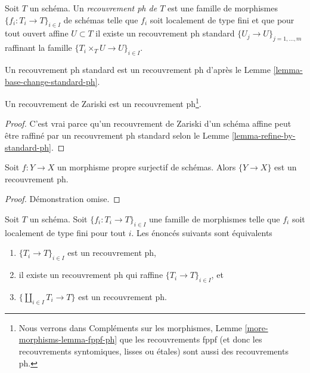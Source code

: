 \begin{definition}
\label{definition-ph-covering}
Soit $T$ un schéma. Un {\it recouvrement ph de $T$} est une famille de morphismes $\{f_i : T_i \to T\}_{i \in I}$ de schémas telle que $f_i$ soit localement de type fini et que pour tout ouvert affine $U \subset T$ il existe un recouvrement ph standard $\{U_j \to U\}_{j = 1, \ldots, m}$ raffinant la famille $\{T_i \times_T U \to U\}_{i \in I}$.
\end{definition}

\noindent
Un recouvrement ph standard est un recouvrement ph d'après le Lemme \ref{lemma-base-change-standard-ph}.

\begin{lemma}
\label{lemma-zariski-ph}
Un recouvrement de Zariski est un recouvrement ph\footnote{Nous verrons dans Compléments sur les morphismes, Lemme \ref{more-morphisms-lemma-fppf-ph} que les recouvrements fppf (et donc les recouvrements syntomiques, lisses ou étales) sont aussi des recouvrements ph.}.
\end{lemma}

\begin{proof}
C'est vrai parce qu'un recouvrement de Zariski d'un schéma affine peut être raffiné par un recouvrement ph standard selon le Lemme \ref{lemma-refine-by-standard-ph}.
\end{proof}

\begin{lemma}
\label{lemma-surjective-proper-ph}
Soit $f : Y \to X$ un morphisme propre surjectif de schémas. Alors $\{Y \to X\}$ est un recouvrement ph.
\end{lemma}

\begin{proof}
Démonstration omise.
\end{proof}

\begin{lemma}
\label{lemma-refine-by-ph}
Soit $T$ un schéma. Soit $\{f_i : T_i \to T\}_{i \in I}$ une famille de morphismes telle que $f_i$ soit localement de type fini pour tout $i$. Les énoncés suivants sont équivalents
\begin{enumerate}
\item $\{T_i \to T\}_{i \in I}$ est un recouvrement ph,
\item il existe un recouvrement ph qui raffine $\{T_i \to T\}_{i \in I}$, et
\item $\{\coprod_{i \in I} T_i \to T\}$ est un recouvrement ph.
\end{enumerate}
\end{lemma}

